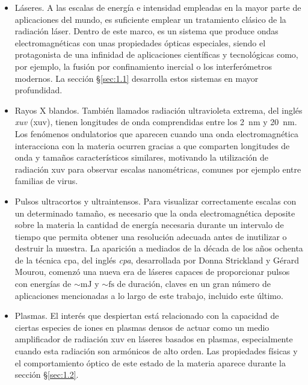 \begin{itemize}
    \item Láseres. A las escalas de energía e intensidad empleadas en la mayor parte de aplicaciones del mundo, es suficiente emplear un tratamiento clásico de la radiación láser. Dentro de este marco, es un sistema que produce ondas electromagnéticas con unas propiedades ópticas especiales, siendo el protagonista de una infinidad de aplicaciones científicas y tecnológicas como, por ejemplo, la fusión por confinamiento inercial o los interferómetros modernos. La sección \S\ref{sec:1.1} desarrolla estos sistemas en mayor profundidad.
    \item Rayos X blandos. También llamados radiación ultravioleta extrema, del inglés \emph{\acrlong{xuv}} (\acrshort{xuv}), tienen longitudes de onda comprendidas entre los \qty{2}{\nm} y \qty{20}{\nm}. Los fenómenos ondulatorios que aparecen cuando una onda electromagnética interacciona con la materia ocurren gracias a que comparten longitudes de onda y tamaños característicos similares, motivando la utilización de radiación \acrshort{xuv} para observar escalas nanométricas, comunes por ejemplo entre familias de virus.
    \item Pulsos ultracortos y ultraintensos. Para visualizar correctamente escalas con un determinado tamaño, es necesario que la onda electromagnética deposite sobre la materia la cantidad de energía necesaria durante un intervalo de tiempo que permita obtener una resolución adecuada antes de inutilizar o destruir la muestra. La aparición a mediados de la década de los años ochenta de la técnica \acrshort{cpa}, del inglés \emph{\acrlong{cpa}}, desarrollada por Donna Strickland y Gérard Mourou\autocite{Strickland1985CompressionPulses}, comenzó una nueva era de láseres capaces de proporcionar pulsos con energías de $\sim\unit{\mJ}$ y $\sim\unit{\fs}$ de duración, claves en un gran número de aplicaciones mencionadas a lo largo de este trabajo, incluido este último.
    \item Plasmas. El interés que despiertan está relacionado con la capacidad de ciertas especies de iones en plasmas densos de actuar como un medio amplificador de radiación \acrshort{xuv} en láseres basados en plasmas, especialmente cuando esta radiación son armónicos de alto orden. Las propiedades físicas y el comportamiento óptico de este estado de la materia aparece durante la sección \S\ref{sec:1.2}. 

\end{itemize}
